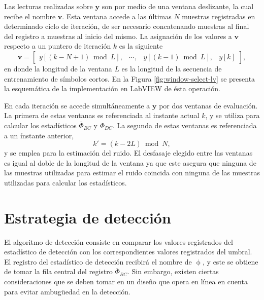 Las lecturas realizadas sobre $\mathbf{y}$ son por medio de una ventana deslizante, la cual recibe el nombre $\mathbf{v}$. Esta ventana accede a las últimas $N$ muestras registradas en determinado ciclo de iteración, de ser necesario concatenando muestras al final del registro a muestras al inicio del mismo. La asignación de los valores a $\mathbf{v}$ respecto a un puntero de iteración $k$ es la siguiente
\begin{equation}
    \mathbf{v} = \begin{bmatrix}
        y\left[(k-N+1) \bmod L\right], & \cdots, &  y\left[(k-1) \bmod L\right], & y[k]
    \end{bmatrix},
\end{equation}
en donde la longitud de la ventana $L$ es la longitud de la secuencia de entrenamiento de símbolos cortos. En la Figura \ref{fig:window-select-lv} se presenta la esquemática de la implementación en LabVIEW de ésta operación. 

En cada iteración se accede simultáneamente a $\mathbf{y}$ por dos ventanas de evaluación. La primera de estas ventanas es referenciada al instante actual $k$, y se utiliza para calcular los estadísticos $\overline{\Phi}_{BC}$ y $\Phi_{DC}$. La segunda de estas ventanas es referenciada a un ínstante anterior,
\begin{equation}
    k' = (k-2L) \bmod N,
\end{equation}
y se emplea para la estimación del ruido. El desfasaje elegido entre las ventanas es igual al doble de la longitud de la ventana ya que este asegura que ninguna de las muestras utilizadas para estimar el ruido coincida con ninguna de las muestras utilizadas para calcular los estadísticos.


\section{Estrategia de detección}
\label{S:ch5-detección}

El algoritmo de detección consiste en comparar los valores registrados del estadístico de detección con los correspondientes valores registrados del umbral. El registro del estadístico de detección recibirá el nombre de $\upphi$, y este se obtiene de tomar la fila central del registro $\overline{\Phi}_{BC}$. Sin embargo, existen ciertas consideraciones que se deben tomar en un diseño que opera en línea en cuenta para evitar ambugüedad en la detección.


